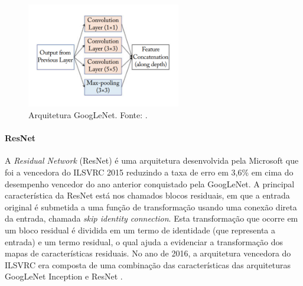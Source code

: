 \begin{figure}[!ht]
	\centering
	\caption{Arquitetura GoogLeNet. Fonte: \cite{ref:khan}.}
	\label{img:googlenet}
	\includegraphics[width=0.6\textwidth]{./img/googlenet}

\end{figure}

\paragraph{ResNet} A \emph{Residual Network} (ResNet) é uma arquitetura desenvolvida pela Microsoft que foi a vencedora do ILSVRC 2015 reduzindo a taxa de erro em 3,6\% em cima do desempenho vencedor do ano anterior conquistado pela GoogLeNet. A principal característica da ResNet está nos chamados blocos residuais, em que a entrada original é submetida a uma função de transformação usando uma conexão direta da entrada, chamada \emph{skip identity connection}. Esta transformação que ocorre em um bloco residual é dividida em um termo de identidade (que representa a entrada) e um termo residual, o qual ajuda a evidenciar a transformação dos mapas de características residuais. No ano de 2016, a arquitetura vencedora do ILSVRC era composta de uma combinação das características das arquiteturas GoogLeNet Inception e ResNet \cite{ref:khan}.